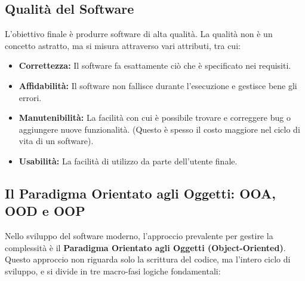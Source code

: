 \documentclass[10pt, a4paper]{article}
\begin{document}
\subsection{Qualità del Software}
L'obiettivo finale è produrre software di alta qualità. La qualità non è un concetto astratto, ma si misura attraverso vari attributi, tra cui:
\begin{itemize}
    \item \textbf{Correttezza:} Il software fa esattamente ciò che è specificato nei requisiti.
    \item \textbf{Affidabilità:} Il software non fallisce durante l'esecuzione e gestisce bene gli errori.
    \item \textbf{Manutenibilità:} La facilità con cui è possibile trovare e correggere bug o aggiungere nuove funzionalità. (Questo è spesso il costo maggiore nel ciclo di vita di un software).
    \item \textbf{Usabilità:} La facilità di utilizzo da parte dell'utente finale.
\end{itemize}

\subsection{Il Paradigma Orientato agli Oggetti: OOA, OOD e OOP}
Nello sviluppo del software moderno, l'approccio prevalente per gestire la complessità è il \textbf{Paradigma Orientato agli Oggetti (Object-Oriented)}. Questo approccio non riguarda solo la scrittura del codice, ma l'intero ciclo di sviluppo, e si divide in tre macro-fasi logiche fondamentali:
\end{document}
